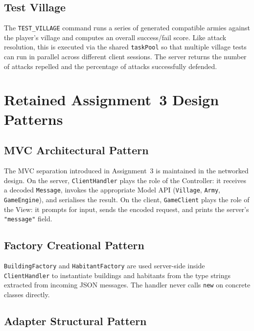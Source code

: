 \documentclass[format=acmsmall, review=false, screen=true]{acmart}
\begin{document}
\subsection{Test Village}

The \texttt{TEST\_VILLAGE} command runs a series of generated compatible armies
against the player's village and computes an overall success/fail score.  Like
attack resolution, this is executed via the shared \texttt{taskPool} so that
multiple village tests can run in parallel across different client sessions.
The server returns the number of attacks repelled and the percentage of attacks
successfully defended.

\section{Retained Assignment~3 Design Patterns}

\subsection{MVC Architectural Pattern}

The MVC separation introduced in Assignment~3 is maintained in the networked
design.  On the server, \texttt{ClientHandler} plays the role of the
Controller: it receives a decoded \texttt{Message}, invokes the appropriate
Model API (\texttt{Village}, \texttt{Army}, \texttt{GameEngine}), and
serialises the result.  On the client, \texttt{GameClient} plays the role of
the View: it prompts for input, sends the encoded request, and prints the
server's \texttt{"message"} field.

\subsection{Factory Creational Pattern}

\texttt{BuildingFactory} and \texttt{HabitantFactory} are used server-side
inside \texttt{ClientHandler} to instantiate buildings and habitants from the
type strings extracted from incoming JSON messages.  The handler never calls
\texttt{new} on concrete classes directly.

\subsection{Adapter Structural Pattern}
\end{document}
